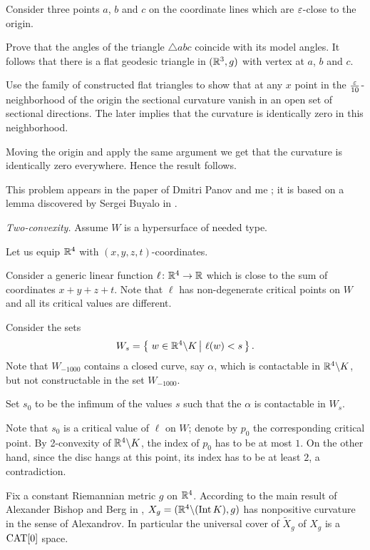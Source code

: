Consider three points $a$, $b$ and $c$ 
on the coordinate lines which are $\varepsilon$-close 
to the origin.

Prove that the angles of the triangle $\triangle abc$
coincide with its model angles.
It follows that there is a flat geodesic triangle in $(\mathbb{R}^3,g)$ with vertex at $a$, $b$ and $c$.

Use the family of constructed flat triangles 
to show that at any $x$ point in the $\tfrac{\varepsilon}{10}$-neighborhood of the origin
the sectional curvature 
vanish in an open set of sectional directions.
The later implies that the curvature is identically zero 
in this neighborhood.

Moving the origin and apply the same argument we get that the curvature is identically zero everywhere.
Hence the result follows. 

This problem appears in the paper of Dmitri Panov and me \cite{panov-petrunin}; 
it is based on a lemma discovered by Sergei Buyalo in \cite{buyalo}.

\textit{Two-convexity.}
Assume $W$ is a hypersurface of needed type.

Let us equip $\mathbb{R}^4$ with $(x,y,z,t)$-coordinates.

Consider a generic linear function $\ell\colon\mathbb{R}^4\to\mathbb{R}$
which is close to the sum of coordinates $x+y+z+t$.
Note that $\ell$
has non-degenerate critical points on $W$ and all its critical values are different.

Consider the sets 
$$W_s=\set{w\in \RR^4\backslash K}{\ell(w)<s}.$$
Note that $W_{-1000}$ contains a closed curve, say $\alpha$, 
which is contactable in $\mathbb{R}^4\backslash K$, 
but not constructable in the set $W_{-1000}$.

Set $s_0$ to be the infimum of the values $s$ such that
the $\alpha$ is contactable in $W_s$.

Note that $s_0$ is a critical value of $\ell$ on $W$;
denote by $p_0$ the corresponding critical point.
By 2-convexity of $\mathbb{R}^4\backslash K$,
the index of $p_0$ has to be at most $1$.
On the other hand, since the disc hangs at this point,
its index has to be at least $2$,
 a contradiction.

Fix a constant Riemannian metric $g$ on $\mathbb{R}^4$.
According to the main result of Alexander Bishop and Berg in \cite{ABB}, $X_g=(\mathbb{R}^4\backslash (\operatorname{\rm Int}\nolimits K),g)$ has nonpositive curvature in the sense of Alexandrov.
In particular the universal cover of $\tilde X_g$ of $X_g$ is a $\operatorname{\rm CAT}\nolimits[0]$ space.

